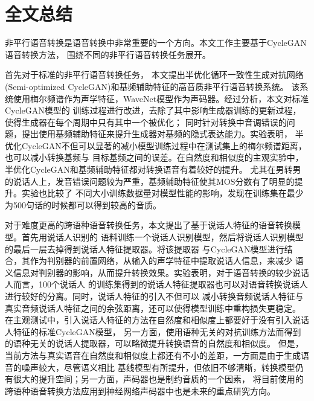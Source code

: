 \chapter{全文总结}
非平行语音转换是语音转换中非常重要的一个方向。本文工作主要基于CycleGAN语音转换方法，
围绕不同的非平行语音转换任务展开。

首先对于标准的非平行语音转换任务，
本文提出半优化循环一致性生成对抗网络(Semi-optimized CycleGAN)和基频辅助特征的高音质非平行语音转换系统。
该系统使用梅尔频谱作为声学特征，WaveNet模型作为声码器。经过分析，本文对标准CycleGAN模型的
训练过程进行改进，去除了其中影响生成器训练的更新过程，使得生成器在每个周期中只有其中一个被优化；
同时针对转换中音调错误的问题，提出使用基频辅助特征来提升生成器对基频的隐式表达能力。实验表明，
半优化CycleGAN不但可以显著的减小模型训练过程中在测试集上的梅尔频谱距离，也可以减小转换基频与
目标基频之间的误差。在自然度和相似度的主观实验中，半优化CycleGAN和基频辅助特征都对转换语音有着较好的提升。
尤其在男转男的说话人上，发音错误问题较为严重，基频辅助特征使其MOS分数有了明显的提升。实验也比较了
不同大小训练数据量对模型性能的影响，发现在训练集在最少为500句话的时候都可以得到较高的音质。

对于难度更高的跨语种语音转换任务，本文提出了基于说话人特征的语音转换模型。首先用说话人识别的
语料训练一个说话人识别模型，然后将说话人识别模型的最后一层去掉得到说话人特征提取器。将该提取器
与CycleGAN模型进行结合，其作为判别器的前置网络，从输入的声学特征中提取说话人信息，来减少
语义信息对判别器的影响，从而提升转换效果。实验表明，对于语音转换的较少说话人而言，100个说话人
的训练集得到的说话人特征提取器也可以对语音转换说话人进行较好的分离。同时，说话人特征的引入不但可以
减小转换音频说话人特征与真实音频说话人特征之间的余弦距离，还可以使得模型训练中重构损失更稳定。
在主观测试中，引入说话人特征的方法在自然度和相似度上都要好于没有引入说话人特征的标准CycleGAN模型，
另一方面，使用语种无关的对抗训练方法而得到的语种无关的说话人提取器，可以略微提升转换语音的自然度和相似度。
但是，当前方法与真实语音在自然度和相似度上都还有不小的差距，一方面是由于生成语音的噪声较大，尽管语义相比
基线模型有所提升，但依旧不够清晰，转换模型仍有很大的提升空间；另一方面，声码器也是制约音质的一个因素，
将目前使用的跨语种语音转换方法应用到神经网络声码器中也是未来的重点研究方向。